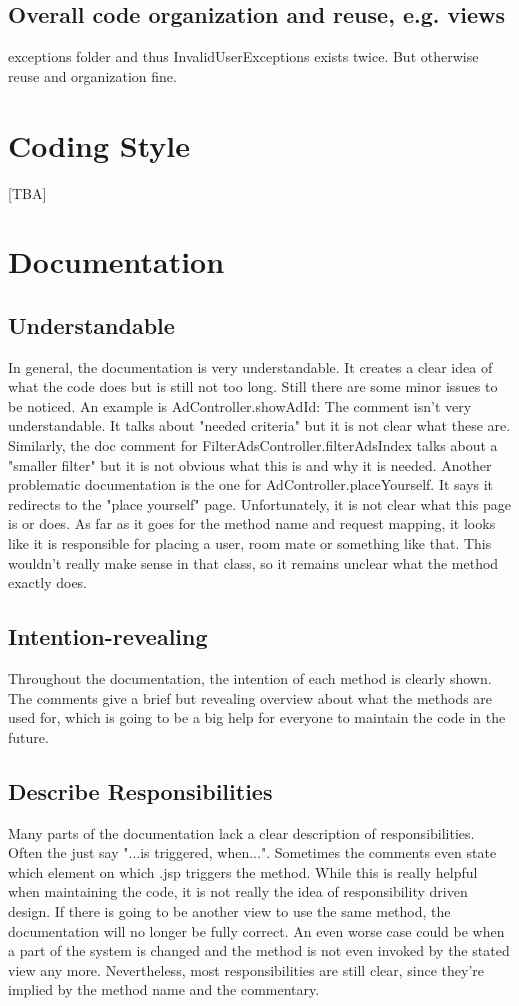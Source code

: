 \documentclass{scrreprt}
\begin{document}
\subsection{Overall code organization and reuse, e.g. views}
exceptions folder and thus InvalidUserExceptions exists twice. But otherwise reuse and organization fine.

\section{Coding Style}
[TBA]

\section{Documentation}
\subsection{Understandable}
In general, the documentation is very understandable. It creates a clear idea of what the code does but is still not too long. Still there are some minor issues to be noticed. An example is AdController.showAdId: The comment isn't very understandable. It talks about "needed criteria" but it is not clear what these are. Similarly, the doc comment for FilterAdsController.filterAdsIndex talks about a "smaller filter" but it is not obvious what this is and why it is needed. Another problematic documentation is the one for AdController.placeYourself. It says it redirects to the "place yourself" page. Unfortunately, it is not clear what this page is or does. As far as it goes for the method name and request mapping, it looks like it is responsible for placing a user, room mate or something like that. This wouldn't really make sense in that class, so it remains unclear what the method exactly does.

\subsection{Intention-revealing}
Throughout the documentation, the intention of each method is clearly shown. The comments give a brief but revealing overview about what the methods are used for, which is going to be a big help for everyone to maintain the code in the future.

\subsection{Describe Responsibilities}
Many parts of the documentation lack a clear description of responsibilities. Often the just say "...is triggered, when...". Sometimes the comments even state which element on which .jsp triggers the method. While this is really helpful when maintaining the code, it is not really the idea of responsibility driven design. If there is going to be another view to use the same method, the documentation will no longer be fully correct. An even worse case could be when a part of the system is changed and the method is not even invoked by the stated view any more. Nevertheless, most responsibilities are still clear, since they're implied by the method name and the commentary. 
\end{document}
